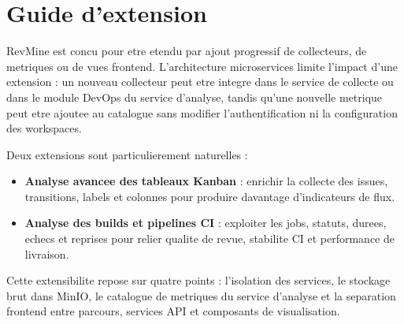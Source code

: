 \section{Guide d'extension}

RevMine est concu pour etre etendu par ajout progressif de collecteurs, de metriques ou de vues
frontend. L'architecture microservices limite l'impact d'une extension : un nouveau collecteur
peut etre integre dans le service de collecte ou dans le module DevOps du service d'analyse,
tandis qu'une nouvelle metrique peut etre ajoutee au catalogue sans modifier l'authentification
ni la configuration des workspaces.

Deux extensions sont particulierement naturelles :

\begin{itemize}
    \item \textbf{Analyse avancee des tableaux Kanban} : enrichir la collecte des issues,
          transitions, labels et colonnes pour produire davantage d'indicateurs de flux.
    \item \textbf{Analyse des builds et pipelines CI} : exploiter les jobs, statuts,
          durees, echecs et reprises pour relier qualite de revue, stabilite CI et performance de
          livraison.
\end{itemize}

Cette extensibilite repose sur quatre points : l'isolation des services, le stockage brut dans
MinIO, le catalogue de metriques du service d'analyse et la separation frontend entre parcours,
services API et composants de visualisation.
